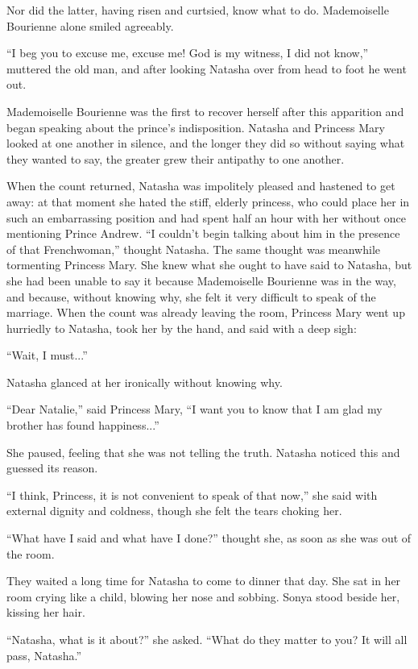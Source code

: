 Nor did the latter, having risen and curtsied, know what to do.
Mademoiselle Bourienne alone smiled agreeably.

``I beg you to excuse me, excuse me! God is my witness, I did not
know,'' muttered the old man, and after looking Natasha over from
head to foot he went out.

Mademoiselle Bourienne was the first to recover herself after
this apparition and began speaking about the prince's
indisposition. Natasha and Princess Mary looked at one another in
silence, and the longer they did so without saying what they
wanted to say, the greater grew their antipathy to one another.

When the count returned, Natasha was impolitely pleased and
hastened to get away: at that moment she hated the stiff, elderly
princess, who could place her in such an embarrassing position
and had spent half an hour with her without once mentioning
Prince Andrew. ``I couldn't begin talking about him in the
presence of that Frenchwoman,'' thought Natasha.  The same
thought was meanwhile tormenting Princess Mary. She knew what she
ought to have said to Natasha, but she had been unable to say it
because Mademoiselle Bourienne was in the way, and because,
without knowing why, she felt it very difficult to speak of the
marriage. When the count was already leaving the room, Princess
Mary went up hurriedly to Natasha, took her by the hand, and said
with a deep sigh:

``Wait, I must...''

Natasha glanced at her ironically without knowing why.

``Dear Natalie,'' said Princess Mary, ``I want you to know that I
am glad my brother has found happiness...''

She paused, feeling that she was not telling the truth. Natasha
noticed this and guessed its reason.

``I think, Princess, it is not convenient to speak of that now,''
she said with external dignity and coldness, though she felt the
tears choking her.

``What have I said and what have I done?'' thought she, as soon
as she was out of the room.

They waited a long time for Natasha to come to dinner that
day. She sat in her room crying like a child, blowing her nose
and sobbing. Sonya stood beside her, kissing her hair.

``Natasha, what is it about?'' she asked. ``What do they matter
to you? It will all pass, Natasha.''

